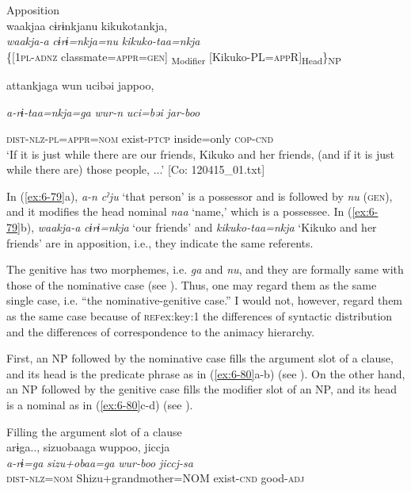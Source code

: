 \begin{table}
\ex Apposition\\
{\TM}
\glll  waakjaa  cɨrɨnkjanu  kikukotankja,\\
\textit{waakja-a}  \textit{cɨrɨ=nkja=nu}  \textit{kikuko-taa=nkja}\\
\{[1\textsc{pl}-\textsc{adnz}  classmate=\textsc{appr}=\textsc{gen}]\textsubscript{ Modifier}  [Kikuko-PL=\textsc{app}R]\textsubscript{Head}\}\textsubscript{NP}

      attankjaga  wun  ucibəi  jappoo,

      \textit{a-rɨ-taa=nkja=ga}  \textit{wur-n}  \textit{uci=bəi}  \textit{jar-boo}

      \textsc{dist}-\textsc{nlz}-\textsc{pl}=\textsc{appr}=\textsc{nom}  exist-\textsc{ptcp}  inside=only  \textsc{cop}-\textsc{cnd}\\
\glt ‘If it is just while there are our friends, Kikuko and her friends, (and if it is just while there are) those people, ...’ [Co: 120415\_01.txt]
\z

In (\ref{ex:6-79}a), \textit{a-n} \textit{cˀju} ‘that person’ is a possessor and is followed by \textit{nu} (\textsc{gen}), and it modifies the head nominal \textit{naa} ‘name,’ which is a possessee. In (\ref{ex:6-79}b), \textit{waakja-a} \textit{cɨrɨ=nkja} ‘our friends’ and \textit{kikuko-taa=nkja} ‘Kikuko and her friends’ are in apposition, i.e., they indicate the same referents.

The genitive has two morphemes, i.e. \textit{ga} and \textit{nu}, and they are formally same with those of the nominative case (see ). Thus, one may regard them as the same single case, i.e. “the nominative-genitive case.” I would not, however, regard them as the same case because of \textsc{ref}{ex:key:1} the differences of syntactic distribution and  the differences of correspondence to the animacy hierarchy.

First, an NP followed by the nominative case fills the argument slot of a clause, and its head is the predicate phrase as in (\ref{ex:6-80}a-b) (see ). On the other hand, an NP followed by the genitive case fills the modifier slot of an NP, and its head is a nominal as in (\ref{ex:6-80}c-d) (see ).

\ea\label{ex:6-80}
 Filling the argument slot of a clause\\

 \ea {\TM}  arɨga..,  sizuobaaga  wuppoo,  jiccja\\
\glll \textit{a-rɨ=ga}  \textit{sizu+obaa=ga}  \textit{wur-boo}  \textit{jiccj-sa}\\
\textsc{dist}-\textsc{nlz}=\textsc{nom}  Shizu+grandmother=NOM  exist-\textsc{cnd}  good-\textsc{adj}


\end{table}
